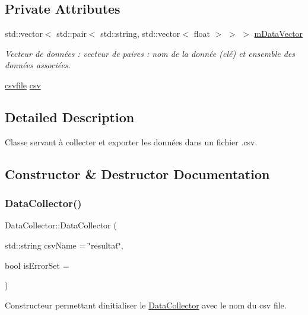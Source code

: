 \subsection*{Private Attributes}
\begin{DoxyCompactItemize}
\item 
std\+::vector$<$ std\+::pair$<$ std\+::string, std\+::vector$<$ float $>$ $>$ $>$ \hyperlink{classDataCollector_a97505c7a9d744d9e3bbeb9909d76bb9f}{m\+Data\+Vector}
\begin{DoxyCompactList}\small\item\em Vecteur de données \+: vecteur de paires \+: nom de la donnée (clé) et ensemble des données associées. \end{DoxyCompactList}\item 
\hyperlink{classcsvfile}{csvfile} \hyperlink{classDataCollector_a8150de03c388af2d36cfb8f15cd28189}{csv}
\end{DoxyCompactItemize}


\subsection{Detailed Description}
Classe servant à collecter et exporter les données dans un fichier .csv. 

\subsection{Constructor \& Destructor Documentation}
\mbox{\label{classDataCollector_a75668f55c1c689c231d00efd1613f3fd}} 
\subsubsection{\texorpdfstring{Data\+Collector()}{DataCollector()}}
{\footnotesize\ttfamily Data\+Collector\+::\+Data\+Collector (\begin{DoxyParamCaption}\item[{std\+::string}]{csv\+Name = {\ttfamily \char`\"{}resultat\char`\"{}},  }\item[{bool}]{is\+Error\+Set = {} }\end{DoxyParamCaption})}



Constructeur permettant d\textquotesingle{}initialiser le \hyperlink{classDataCollector}{Data\+Collector} avec le nom du csv file. 

